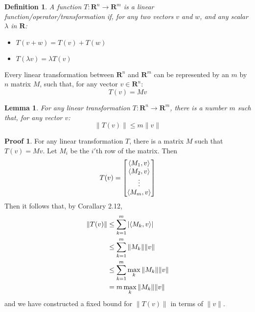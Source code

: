 \documentclass[12pt]{amsbook}
\theoremstyle{plain}
\newtheorem{definition}{Definition}
\newtheorem{lemma}[theorem]{Lemma}
\theoremstyle{definition}
\newtheorem*{prf}{Proof}
\DeclarePairedDelimiter{\inner}{\langle}{\rangle}
\begin{document}
\begin{definition}
  A function $T:\mathbf{R}^n \to \mathbf{R}^m$ is a linear function/operator/transformation if, for any two vectors $v$ and $w$, and any scalar $\lambda$ in $\mathbf{R}$:

  \begin{itemize}
    \item $T(v + w) = T(v) + T(w)$
    \item $T(\lambda v) = \lambda T(v)$
  \end{itemize}
\end{definition}

Every linear transformation between $\mathbf{R}^n$ and $\mathbf{R}^m$ can be represented by an $m$ by $n$ matrix $M$, such that, for any vector $v \in \mathbf{R}^n$:
%
\[ T(v) = Mv \]

\begin{lemma}
  For any linear transformation $T:\mathbf{R}^n \to \mathbf{R}^m$, there is a number $m$ such that, for any vector $v$:
  \[ \| T(v) \| \leq m \| v \| \]
\end{lemma}
\begin{prf}
  For any linear transformation $T$, there is a matrix $M$ such that $T(v) = Mv$. Let $M_i$ be the $i'$th row of the matrix. Then
  \[ T(v) = \begin{bmatrix} \inner{M_1, v} \\ \inner{M_2, v} \\ \vdots \\ \inner{M_m, v} \end{bmatrix} \]
  Then it follows that, by Corallary 2.12,
  \begin{align*}
    \| T(v) \| &\leq \sum_{k = 1}^m | \inner{M_k, v} |\\
               &\leq \sum_{k = 1}^m \| M_k \| \| v \|\\
               &\leq \sum_{k = 1}^m \max_{k} \| M_k \| \| v \|\\
               &= m \max_{k} \| M_k \| \| v \|
  \end{align*}
  and we have constructed a fixed bound for $\| T(v) \|$ in terms of $\| v \|$.
\end{prf}
\end{document}
